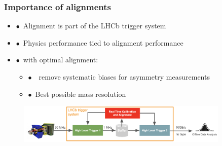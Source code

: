 \documentclass[aspectratio=1610, 12pt, xcolor=dvipsnames]{beamer}
\begin{document}
\begin{frame}\frametitle{Importance of alignments}
  \begin{itemize}
    \item $\bullet$\, Alignment is part of the LHCb trigger system
    \item $\bullet$\, Physics performance tied to alignment performance
    \item $\bullet$\, with optimal alignment:
    \begin{itemize}
      \item $\bullet$\, \to\, remove systematic biases for asymmetry measurements
      \item $\bullet$\, Best possible mass resolution
    \end{itemize}
  \end{itemize}
  \begin{figure}
      \includegraphics[width=0.9\textwidth]{logos/dataflow.png}%
  \end{figure}
\end{frame}
\end{document}
